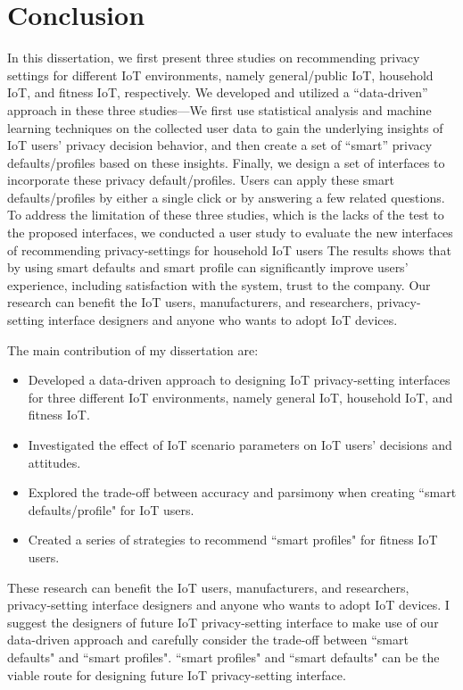 \chapter{Conclusion}\label{chapter:conclusion}

In this dissertation, we first present three studies on recommending privacy settings for different IoT environments, namely general/public IoT, household IoT, and fitness IoT, respectively. We developed and utilized a ``data-driven” approach in these three studies—We first use statistical analysis and machine learning techniques on the collected user data to gain the underlying insights of IoT users' privacy decision behavior, and then create a set of ``smart” privacy defaults/profiles based on these insights. Finally, we design a set of interfaces to incorporate these privacy default/profiles. Users can apply these smart defaults/profiles by either a single click or by answering a few related questions. To address the limitation of these three studies, which is the lacks of the test to the proposed interfaces, we conducted a user study to evaluate the new interfaces of recommending privacy-settings for household IoT users The results shows that by using smart defaults and smart profile can significantly improve users' experience, including satisfaction with the system, trust to the company. Our research can benefit the IoT users, manufacturers, and researchers, privacy-setting interface designers and anyone who wants to adopt IoT devices.

The main contribution of my dissertation are:
\begin{itemize}
	\item Developed a data-driven approach to designing IoT privacy-setting interfaces for three different IoT environments, namely general IoT, household IoT, and fitness IoT.
	\item Investigated the effect of IoT scenario parameters on IoT users' decisions and attitudes.
	\item Explored the trade-off between accuracy and parsimony when creating ``smart defaults/profile" for IoT users.
	\item Created a series of strategies to recommend ``smart profiles" for fitness IoT users.
\end{itemize}

These research can benefit the IoT users, manufacturers, and researchers, privacy-setting interface designers and anyone who wants to adopt IoT devices.
I suggest the designers of future IoT privacy-setting interface to make use of our data-driven approach and carefully consider the trade-off between ``smart defaults" and ``smart profiles". ``smart profiles" and ``smart defaults" can be the viable route for designing future IoT privacy-setting interface.

